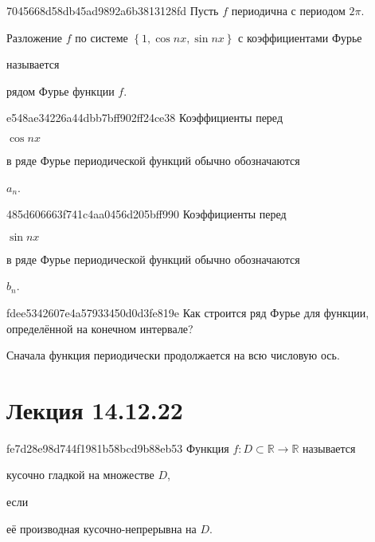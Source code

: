 \begin{note}{7045668d58db45ad9892a6b3813128fd}
    Пусть \({ f }\) периодична с периодом \({ 2\pi }\).
    \begin{icloze}{2}Разложение \({ f }\) по системе \({ \left\{ 1, \cos nx, \sin nx \right\} }\) с коэффициентами Фурье\end{icloze} называется \begin{icloze}{1}рядом Фурье функции \({ f }\).\end{icloze}
\end{note}

\begin{note}{e548ae34226a44dbb7bff902ff24ce38}
    Коэффициенты перед \begin{icloze}{2}\({ \cos nx }\)\end{icloze} в ряде Фурье периодической функций обычно обозначаются \begin{icloze}{1}\({ a_n }\).\end{icloze}
\end{note}

\begin{note}{485d606663f741c4aa0456d205bff990}
    Коэффициенты перед \begin{icloze}{2}\({ \sin nx }\)\end{icloze} в ряде Фурье периодической функций обычно обозначаются \begin{icloze}{1}\({ b_n }\).\end{icloze}
\end{note}

\begin{note}{fdee5342607e4a57933450d0d3fe819e}
    Как строится ряд Фурье для функции, определённой на конечном интервале?

    \begin{cloze}{1}
        Сначала функция периодически продолжается на всю числовую ось.
    \end{cloze}
\end{note}

\section{Лекция 14.12.22}
\begin{note}{fe7d28e98d744f1981b58bcd9b88eb53}
    Функция \({ f : D \subset \mathbb R \to \mathbb R }\) называется \begin{icloze}{2}кусочно гладкой на множестве \({ D }\),\end{icloze} если \begin{icloze}{1}её производная кусочно-непрерывна на \({ D }\).\end{icloze}
\end{note}

